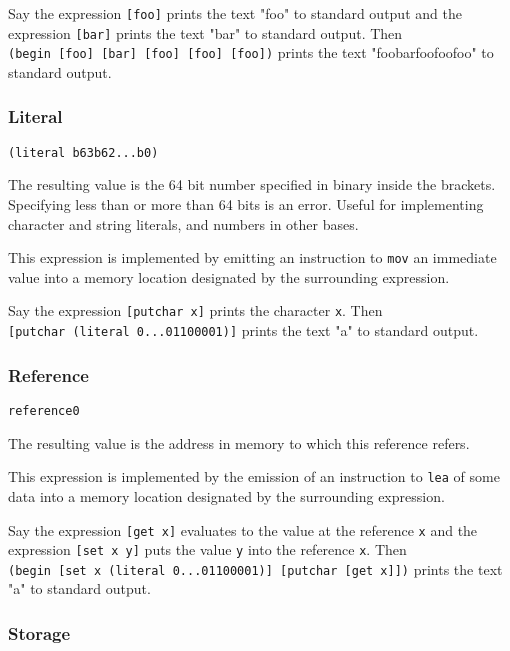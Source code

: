 \documentclass[]{article}
\begin{document}
Say the expression \texttt{{[}foo{]}} prints the text "foo" to standard
output and the expression \texttt{{[}bar{]}} prints the text "bar" to
standard output. Then
\texttt{(begin\ {[}foo{]}\ {[}bar{]}\ {[}foo{]}\ {[}foo{]}\ {[}foo{]})}
prints the text "foobarfoofoofoo" to standard output.

\hypertarget{literal}{%
\subsubsection{Literal}\label{literal}}

\begin{verbatim}
(literal b63b62...b0)
\end{verbatim}

The resulting value is the 64 bit number specified in binary inside the
brackets. Specifying less than or more than 64 bits is an error. Useful
for implementing character and string literals, and numbers in other
bases.

This expression is implemented by emitting an instruction to
\texttt{mov} an immediate value into a memory location designated by the
surrounding expression.

Say the expression \texttt{{[}putchar\ x{]}} prints the character
\texttt{x}. Then \texttt{{[}putchar\ (literal\ 0...01100001){]}} prints
the text "a" to standard output.

\hypertarget{reference}{%
\subsubsection{Reference}\label{reference}}

\begin{verbatim}
reference0
\end{verbatim}

The resulting value is the address in memory to which this reference
refers.

This expression is implemented by the emission of an instruction to
\texttt{lea} of some data into a memory location designated by the
surrounding expression.

Say the expression \texttt{{[}get\ x{]}} evaluates to the value at the
reference \texttt{x} and the expression \texttt{{[}set\ x\ y{]}} puts
the value \texttt{y} into the reference \texttt{x}. Then
\texttt{(begin\ {[}set\ x\ (literal\ 0...01100001){]}\ {[}putchar\ {[}get\ x{]}{]})}
prints the text "a" to standard output.

\hypertarget{storage}{%
\subsubsection{Storage}\label{storage}}
\end{document}
